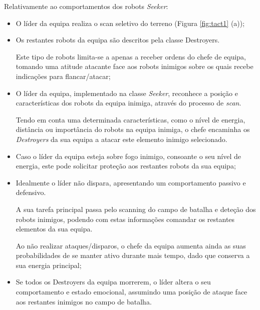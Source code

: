 Relativamente ao comportamentos dos robots \textit{Seeker}:
\begin{itemize}
    \item O líder da equipa realiza o scan seletivo do terreno (Figura \ref{fig:tact1} (a));
    
    \item Os restantes robots da equipa são descritos pela classe Destroyers.
    
    Este tipo de robots limita-se a apenas a receber ordens do chefe de equipa, tomando uma atitude atacante face aos robots inimigos sobre os quais recebe indicações para flancar/atacar;
    
    \item O líder da equipa, implementado na classe \textit{Seeker}, reconhece a posição e características dos robots da equipa inimiga, através do processo de \textit{scan}. 
    
    Tendo em conta uma determinada características, como o nível de energia, distância ou importância do robots na equipa inimiga, o chefe encaminha os \textit{Destroyers} da sua equipa a atacar este elemento inimigo selecionado. 
    
    \item Caso o líder da equipa esteja sobre fogo inimigo, consoante o seu nível de energia, este pode solicitar proteção aos restantes robots da sua equipa;
    
    \item Idealmente o líder não dispara, apresentando um comportamento passivo e defensivo. 
    
    A sua tarefa principal passa pelo scanning do campo de batalha e deteção dos robots inimigos, podendo com estas informações comandar os restantes elementos da sua equipa. 
    
    Ao não realizar ataques/disparos, o chefe da equipa aumenta ainda as suas probabilidades de se manter ativo durante mais tempo, dado que conserva a sua energia principal;
    
    \item Se todos os Destroyers da equipa morrerem, o líder altera o seu comportamento e estado emocional, assumindo uma posição de ataque face aos restantes inimigos no campo de batalha. 
\end{itemize}

